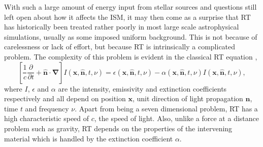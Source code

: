 \documentclass[fleq,usenatbib]{mnras}
\begin{document}
With such a large amount of energy input from stellar sources and questions 
still left open about how it affects the ISM, it may then come as a surprise 
that RT has historically been treated rather poorly in most large scale 
astrophysical simulations, usually as some imposed uniform background. This is 
not because of carelessness or lack of effort, but because RT is intrinsically 
a complicated problem. The complexity of this problem is evident in the 
classical RT equation \citep[e.g.][]{mihalasMihalas84},
\begin{equation} \label{eq:classicrt}
\left[ \frac{1}{c} \frac{\partial}{\partial t} + \mathbf{\hat{n} \cdot \nabla}
 \right] I\left(\mathbf{x}, \mathbf{\hat{n}}, t, \nu\right) = 
\epsilon\left(\mathbf{x}, \mathbf{\hat{n}}, t, \nu\right) - 
\alpha\left(\mathbf{x}, \mathbf{\hat{n}}, t, \nu\right) 
I\left(\mathbf{x}, \mathbf{\hat{n}}, t, \nu\right),
\end{equation} 
where $I$, $\epsilon$ and $\alpha$ are the intensity, emissivity and 
extinction coefficients respectively and all depend on position $\mathbf{x}$, 
unit direction of light propagation $\mathbf{\hat{n}}$, time $t$ and frequency 
$\nu$. Apart from being a seven dimensional problem, RT has a high 
characteristic speed of $c$, the speed of light. Also, unlike a force at a 
distance problem such as gravity, RT depends on the properties of the 
intervening material which is handled by the extinction coefficient $\alpha$.
\end{document}
